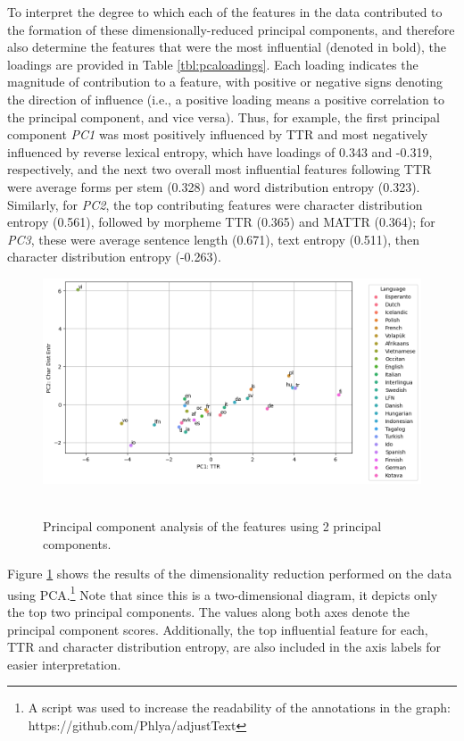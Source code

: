 \documentclass[12pt,a4paper]{article}
\numberwithin{figure}{section}
\numberwithin{table}{section}
\numberwithin{definition}{section}
\begin{document}
To interpret the degree to which each of the features in the data contributed to the formation of these dimensionally-reduced principal components, and therefore also determine the features that were the most influential (denoted in bold), the loadings are provided in Table \ref{tbl:pcaloadings}. Each loading indicates the magnitude of contribution to a feature, with positive or negative signs denoting the direction of influence (i.e., a positive loading means a positive correlation to the principal component, and vice versa). Thus, for example, the first principal component \textit{PC1} was most positively influenced by TTR and most negatively influenced by reverse lexical entropy, which have loadings of 0.343 and -0.319, respectively, and the next two overall most influential features following TTR were average forms per stem (0.328) and word distribution entropy (0.323). Similarly, for \textit{PC2}, the top contributing features were character distribution entropy (0.561), followed by morpheme TTR (0.365) and MATTR (0.364); for \textit{PC3}, these were average sentence length (0.671), text entropy (0.511), then character distribution entropy (-0.263).

\begin{figure}[!h]
  \centering
    \caption{Principal component analysis of the features using 2 principal components.}
    \includegraphics[width=1.0\textwidth]{PCA_of_Features.png}
    \label{fig:pcaanalysis}\
\end{figure}

Figure \ref{fig:pcaanalysis} shows the results of the dimensionality reduction performed on the data using PCA.\footnote{A script was used to increase the readability of the annotations in the graph: https://github.com/Phlya/adjustText} Note that since this is a two-dimensional diagram, it depicts only the top two principal components. The values along both axes denote the principal component scores. Additionally, the top influential feature for each, TTR and character distribution entropy, are also included in the axis labels for easier interpretation. 
\end{document}
